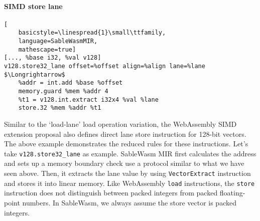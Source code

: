 \paragraph{SIMD store lane} \quad
\begin{lstlisting}[
    basicstyle=\linespread{1}\small\ttfamily, 
    language=SableWasmMIR, 
    mathescape=true]
[..., %base i32, %val v128]
v128.store32_lane offset=%offset align=%align lane=%lane $\Longrightarrow$
    %addr = int.add %base %offset
    memory.guard %mem %addr 4
    %t1 = v128.int.extract i32x4 %val %lane
    store.32 %mem %addr %t1
\end{lstlisting}
Similar to the `load-lane' load operation variation, the WebAssembly SIMD
extension proposal also defines direct lane store instruction for 128-bit
vectors. The above example demonstrates the reduced rules for these
instructions. Let's take \texttt{v128.store32\_lane} as example. SableWasm MIR
first calculates the address and sets up a memory boundary check use a protocol
similar to what we have seen above. Then, it extracts the lane value by using
\texttt{VectorExtract} instruction and stores it into linear memory. Like
WebAssembly \texttt{load} instructions, the \texttt{store} instruction does
not distinguish between packed integers from packed floating-point numbers.
In SableWasm, we always assume the store vector is packed integers.
